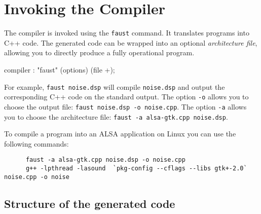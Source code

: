 

\chapter{Invoking the \faust Compiler}
\label{compiler}

The \faust compiler is invoked using the \texttt{faust} command. It translates \faust programs into C++ code.
The generated code can be wrapped into an optional \emph{architecture file}, allowing you to directly produce a fully operational program.

\begin{rail}
compiler : "faust" (options) (file +);
\end{rail}

For example, \lstinline'faust noise.dsp' will compile \lstinline'noise.dsp' and output the corresponding C++ code on the standard output.  The option \lstinline'-o' allows you to choose the output file: \lstinline'faust noise.dsp -o noise.cpp'. The option \lstinline'-a' allows you to choose the architecture file: \lstinline'faust -a alsa-gtk.cpp noise.dsp'. 

To compile a \faust program into an ALSA application on Linux you can use the following commands: 
\begin{lstlisting}
      faust -a alsa-gtk.cpp noise.dsp -o noise.cpp
      g++ -lpthread -lasound  `pkg-config --cflags --libs gtk+-2.0` noise.cpp -o noise
\end{lstlisting} 

\section{Structure of the generated code}

